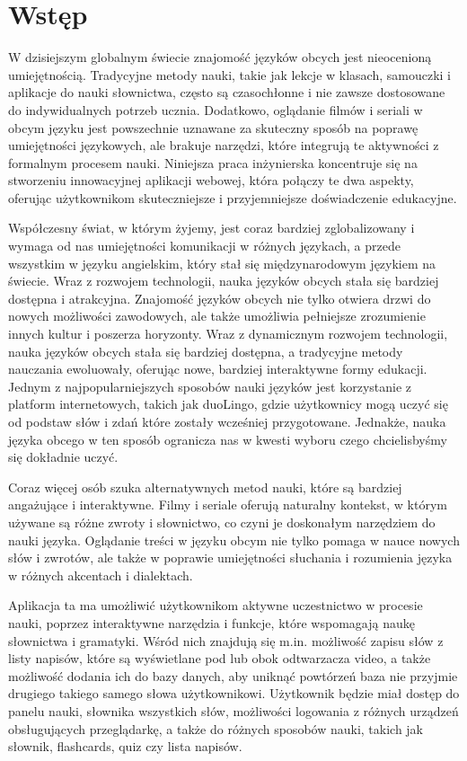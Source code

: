 \section{Wstęp}
W dzisiejszym globalnym świecie znajomość języków obcych jest nieocenioną umiejętnością. Tradycyjne metody nauki, takie jak lekcje w klasach, samouczki i aplikacje do nauki słownictwa, często są czasochłonne i nie zawsze dostosowane do indywidualnych potrzeb ucznia. Dodatkowo, oglądanie filmów i seriali w obcym języku jest powszechnie uznawane za skuteczny sposób na poprawę umiejętności językowych, ale brakuje narzędzi, które integrują te aktywności z formalnym procesem nauki. Niniejsza praca inżynierska koncentruje się na stworzeniu innowacyjnej aplikacji webowej, która połączy te dwa aspekty, oferując użytkownikom skuteczniejsze i przyjemniejsze doświadczenie edukacyjne.

Współczesny świat, w którym żyjemy, jest coraz bardziej zglobalizowany i wymaga od nas umiejętności komunikacji w różnych językach, a przede wszystkim w języku angielskim, który stał się międzynarodowym językiem na świecie. Wraz z rozwojem technologii, nauka języków obcych stała się bardziej dostępna i atrakcyjna. Znajomość języków obcych nie tylko otwiera drzwi do nowych możliwości zawodowych, ale także umożliwia pełniejsze zrozumienie innych kultur i poszerza horyzonty. Wraz z dynamicznym rozwojem technologii, nauka języków obcych stała się bardziej dostępna, a tradycyjne metody nauczania ewoluowały, oferując nowe, bardziej interaktywne formy edukacji. Jednym z najpopularniejszych sposobów nauki języków jest korzystanie z platform internetowych, takich jak duoLingo, gdzie użytkownicy mogą uczyć się od podstaw słów i zdań które zostały wcześniej przygotowane. Jednakże, nauka języka obcego w ten sposób ogranicza nas w kwesti wyboru czego chcielisbyśmy się dokładnie uczyć.

Coraz więcej osób szuka alternatywnych metod nauki, które są bardziej angażujące i interaktywne. Filmy i seriale oferują naturalny kontekst, w którym używane są różne zwroty i słownictwo, co czyni je doskonałym narzędziem do nauki języka. Oglądanie treści w języku obcym nie tylko pomaga w nauce nowych słów i zwrotów, ale także w poprawie umiejętności słuchania i rozumienia języka w różnych akcentach i dialektach.

Aplikacja ta ma umożliwić użytkownikom aktywne uczestnictwo w procesie nauki, poprzez interaktywne narzędzia i funkcje, które wspomagają naukę słownictwa i gramatyki. Wśród nich znajdują się m.in. możliwość zapisu słów z listy napisów, które są wyświetlane pod lub obok odtwarzacza video, a także możliwość dodania ich do bazy danych, aby uniknąć powtórzeń baza nie przyjmie drugiego takiego samego słowa użytkownikowi. Użytkownik będzie miał dostęp do panelu nauki, słownika wszystkich słów, możliwości logowania z różnych urządzeń obsługujących przeglądarkę, a także do różnych sposobów nauki, takich jak słownik, flashcards, quiz czy lista napisów.


